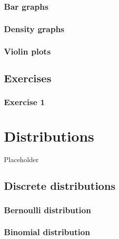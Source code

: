 \documentclass[english,10pt,a4paper,oneside]{book}
\begin{document}
\hypertarget{bar-graphs}{%
\subsection{Bar graphs}\label{bar-graphs}}

\hypertarget{density-graphs}{%
\subsection{Density graphs}\label{density-graphs}}

\hypertarget{violin-plots}{%
\subsection{Violin plots}\label{violin-plots}}

\hypertarget{exercises-1}{%
\section{Exercises}\label{exercises-1}}

\hypertarget{exercise-1-1}{%
\subsection{Exercise 1}\label{exercise-1-1}}

\hypertarget{distributions}{%
\chapter{Distributions}\label{distributions}}

Placeholder

\hypertarget{discrete-distributions}{%
\section{Discrete distributions}\label{discrete-distributions}}

\hypertarget{bernoulli-distribution}{%
\subsection{Bernoulli distribution}\label{bernoulli-distribution}}

\hypertarget{binomial-distribution}{%
\subsection{Binomial distribution}\label{binomial-distribution}}
\end{document}
